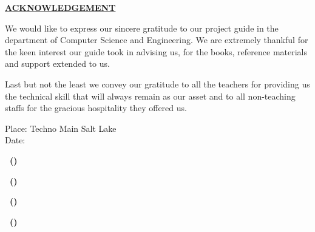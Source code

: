 
\thispagestyle{plain}

\begin{center}
 \Large {\bf \uppercase {\underline {Acknowledgement}}}
\end{center}

\vspace{3\baselineskip}

\noindent
We would like to express our sincere gratitude to our project guide in the department of Computer Science and Engineering. We are extremely thankful for the keen interest our guide took in advising us, for the books, reference materials and support extended to us.


\vspace{\baselineskip}
\noindent
Last but not the least we convey our gratitude to all the teachers for providing us the technical skill that will always remain as our asset and to all non-teaching staffs for the gracious hospitality they offered us.

\vspace{\baselineskip}
\noindent
Place: Techno Main Salt Lake \\
Date: 


\hspace{1.0\baselineskip}

\begin{flushright}

\vspace{2\baselineskip}
\textbf{\mynameone ~(\myrollnoone)}

\vspace{2\baselineskip}
\textbf{\mynametwo ~(\myrollnotwo)}

\vspace{2\baselineskip}
\textbf{\mynamethree ~(\myrollnothree)}

\vspace{2\baselineskip}
\textbf{\mynamefour ~(\myrollnofour)}

\end{flushright}



